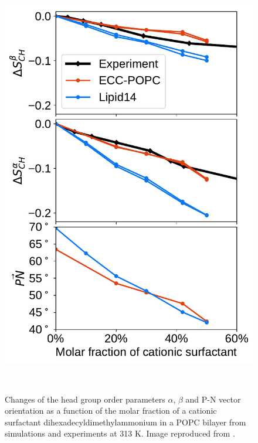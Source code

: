 \documentclass[journal=jpcbfk,manuscript=article]{achemso}
\newlength{\figwidth}
\begin{document}
\begin{figure}[tb!] 
  \centering 
  \includegraphics[width=\figwidth]{../img/ecc_popc/PN_angle_OrdPars-A-B_L14-ECCL17_q80_sig89_surf.pdf} 
  \caption{\label{OrderParameterCHANGESsurf} 
    Changes of the head group order parameters $\alpha$, $\beta$ and P-N vector orientation as a function of 
    the molar fraction of a cationic surfactant dihexadecyldimethylammonium in a POPC bilayer 
    from simulations and experiments \citep{scherer89} at 313 K.
    Image reproduced from \cite{melcr18}.
  } 
 \\
\end{figure} 
\end{document}
